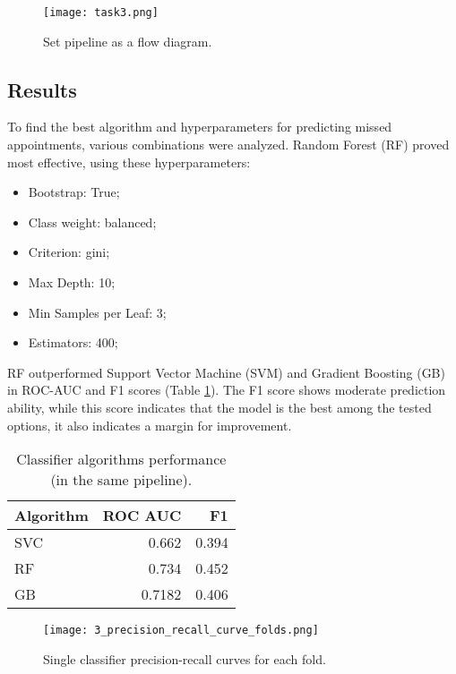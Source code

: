 \documentclass[a4paper,12pt]{article}
\begin{document}
\begin{figure}[h]
  \centering
  \texttt{[image: task3.png]}
  \caption{Set pipeline as a flow diagram.}
  \label{fig:pipeline-3}
\end{figure}
\subsection{Results}

To find the best algorithm and hyperparameters for predicting missed appointments, various combinations were analyzed. Random Forest (RF) proved most effective, using these hyperparameters:
\begin{itemize}
\item Bootstrap: True;
\item Class weight: balanced;
\item Criterion: gini;
\item Max Depth: 10;
\item Min Samples per Leaf: 3;
\item Estimators: 400;
\end{itemize}

RF outperformed Support Vector Machine (SVM) and Gradient Boosting (GB) in ROC-AUC and F1 scores (Table \ref{tab:algorithms-performances-3}). The F1 score shows moderate prediction ability, while this score indicates that the model is the best among the tested options, it also indicates a margin for improvement.

\begin{table}[h]
\centering
\begin{tabular}{lrr}
\toprule
Algorithm & ROC AUC & F1 \\
\midrule
SVC & 0.662 & 0.394 \\
RF & 0.734 & 0.452 \\
GB & 0.7182 & 0.406 \\
\bottomrule
\end{tabular}
\caption{
    Classifier algorithms performance (in the same pipeline).
}
\label{tab:algorithms-performances-3}
\end{table}

\begin{figure}[h]
  \centering
  \texttt{[image: 3\_precision\_recall\_curve\_folds.png]}
  \caption{Single classifier precision-recall curves for each fold.}
  \label{fig:precision-recall-curves-3}
\end{figure}
\end{document}
